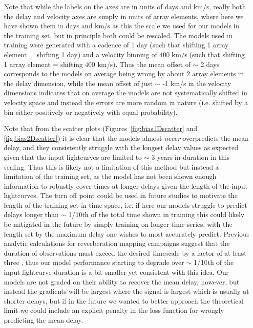 \documentclass[floatfix,twocolumn,trackchanges,linenumbers]{aastex7}
\begin{document}
Note that while the labels on the axes are in units of days and km/s, really both the delay and velocity axes are simply in units of array elements,
where here we have shown them
in days and km/s as this the scale we used for our models in the training set, but in principle both could be rescaled. The models used in training
were generated with a cadence of 1 day (such that shifting 1 array element = shifting 1 day) and a velocity binning of 400 km/s
(such that shifting 1 array element = shifting 400 km/s). Thus the mean offset of $\sim$ 2 days corresponds to the models on average being wrong
by about 2 array elements in the delay dimension, while the mean offset of just $\sim$ -1 km/s in the velocity dimensions indicates that on average
the models are not systematically shifted in velocity space and instead the errors are more random in nature (i.e. shifted by a bin either positively or negatively
with equal probability).

Note that from the scatter plots (Figures~\ref{fig:bias1Dscatter} and \ref{fig:bias2Dscatter}) it is clear that the models almost \textit{never} overpredicts
the mean delay, and they consistently struggle with the longest delay values as expected given that the input lightcurves are limited to $\sim$ 3 years in duration in this scaling.
Thus this is likely not a limitation of this method but instead a limitation of the training set, as the model has not been shown enough information to robustly cover times at longer delays
given the length of the input lightcurves.
The turn off point could be used in future studies to motivate
the length of the training set in time space, i.e. if here our models struggle to predict delays longer than $\sim$ 1/10th of the total time shown in
training this could likely be mitigated in the future by simply training on longer time series, with the length set by the maximum delay one
wishes to most accurately predict. Previous analytic calculations for reverberation mapping campaigns suggest that the duration of observations must exceed
the desired timescale by a factor of at least three \citep{Horne2004_RM_requirements}, thus our model performance starting to degrade over $\sim$ 1/10th of the input lightcurve duration is a bit smaller
yet consistent with this idea. Our models are not graded on their ability to recover the mean delay, however, but instead the gradients will be largest where the signal is largest which is usually at
shorter delays, but if in the future we wanted to better approach the theoretical limit we could include an explicit penalty in the loss function for wrongly predicting the mean delay.
\end{document}
